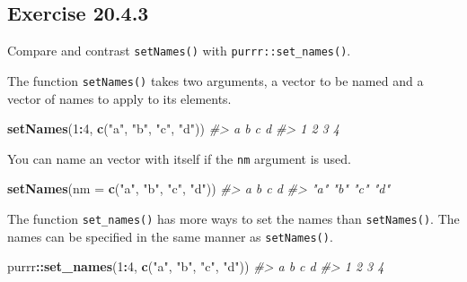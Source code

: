 \documentclass[]{book}
\newenvironment{Shaded}{\begin{snugshade}}{\end{snugshade}}
\newcommand{\CommentTok}[1]{\textcolor[rgb]{0.56,0.35,0.01}{\textit{#1}}}
\newcommand{\DataTypeTok}[1]{\textcolor[rgb]{0.13,0.29,0.53}{#1}}
\newcommand{\DecValTok}[1]{\textcolor[rgb]{0.00,0.00,0.81}{#1}}
\newcommand{\KeywordTok}[1]{\textcolor[rgb]{0.13,0.29,0.53}{\textbf{#1}}}
\newcommand{\NormalTok}[1]{#1}
\newcommand{\OperatorTok}[1]{\textcolor[rgb]{0.81,0.36,0.00}{\textbf{#1}}}
\newcommand{\StringTok}[1]{\textcolor[rgb]{0.31,0.60,0.02}{#1}}
\theoremstyle{plain}
\theoremstyle{remark}
\begin{document}
\hypertarget{exercise-20.4.3}{%
\subsection*{\texorpdfstring{Exercise
{20.4.3}}{Exercise 20.4.3}}\label{exercise-20.4.3}}

Compare and contrast \texttt{setNames()} with
\texttt{purrr::set\_names()}.

The function \texttt{setNames()} takes two arguments, a vector to be
named and a vector of names to apply to its elements.

\begin{Shaded}
\begin{Highlighting}[]
\KeywordTok{setNames}\NormalTok{(}\DecValTok{1}\OperatorTok{:}\DecValTok{4}\NormalTok{, }\KeywordTok{c}\NormalTok{(}\StringTok{"a"}\NormalTok{, }\StringTok{"b"}\NormalTok{, }\StringTok{"c"}\NormalTok{, }\StringTok{"d"}\NormalTok{))}
\CommentTok{#> a b c d }
\CommentTok{#> 1 2 3 4}
\end{Highlighting}
\end{Shaded}

You can name an vector with itself if the \texttt{nm} argument is used.

\begin{Shaded}
\begin{Highlighting}[]
\KeywordTok{setNames}\NormalTok{(}\DataTypeTok{nm =} \KeywordTok{c}\NormalTok{(}\StringTok{"a"}\NormalTok{, }\StringTok{"b"}\NormalTok{, }\StringTok{"c"}\NormalTok{, }\StringTok{"d"}\NormalTok{))}
\CommentTok{#>   a   b   c   d }
\CommentTok{#> "a" "b" "c" "d"}
\end{Highlighting}
\end{Shaded}

The function \texttt{set\_names()} has more ways to set the names than
\texttt{setNames()}. The names can be specified in the same manner as
\texttt{setNames()}.

\begin{Shaded}
\begin{Highlighting}[]
\NormalTok{purrr}\OperatorTok{::}\KeywordTok{set_names}\NormalTok{(}\DecValTok{1}\OperatorTok{:}\DecValTok{4}\NormalTok{, }\KeywordTok{c}\NormalTok{(}\StringTok{"a"}\NormalTok{, }\StringTok{"b"}\NormalTok{, }\StringTok{"c"}\NormalTok{, }\StringTok{"d"}\NormalTok{))}
\CommentTok{#> a b c d }
\CommentTok{#> 1 2 3 4}
\end{Highlighting}
\end{Shaded}
\end{document}
